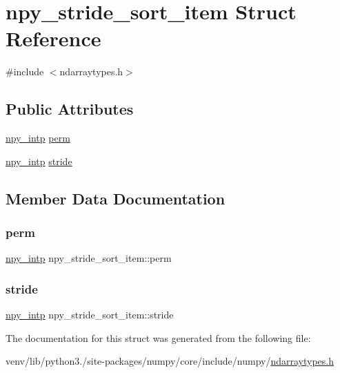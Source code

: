 \hypertarget{structnpy__stride__sort__item}{}\section{npy\+\_\+stride\+\_\+sort\+\_\+item Struct Reference}
\label{structnpy__stride__sort__item}


{\ttfamily \#include $<$ndarraytypes.\+h$>$}

\subsection*{Public Attributes}
\begin{DoxyCompactItemize}
\item 
\hyperlink{npy__common_8h_a2d6effc4d5ecb85675ebfcfaa102b483}{npy\+\_\+intp} \hyperlink{structnpy__stride__sort__item_a62c4593e1cdf5936819b24eab2326162}{perm}
\item 
\hyperlink{npy__common_8h_a2d6effc4d5ecb85675ebfcfaa102b483}{npy\+\_\+intp} \hyperlink{structnpy__stride__sort__item_a58b3a74b21f36004832323552caa0e00}{stride}
\end{DoxyCompactItemize}


\subsection{Member Data Documentation}
\mbox{\label{structnpy__stride__sort__item_a62c4593e1cdf5936819b24eab2326162}} 
\subsubsection{\texorpdfstring{perm}{perm}}
{\footnotesize\ttfamily \hyperlink{npy__common_8h_a2d6effc4d5ecb85675ebfcfaa102b483}{npy\+\_\+intp} npy\+\_\+stride\+\_\+sort\+\_\+item\+::perm}

\mbox{\label{structnpy__stride__sort__item_a58b3a74b21f36004832323552caa0e00}} 
\subsubsection{\texorpdfstring{stride}{stride}}
{\footnotesize\ttfamily \hyperlink{npy__common_8h_a2d6effc4d5ecb85675ebfcfaa102b483}{npy\+\_\+intp} npy\+\_\+stride\+\_\+sort\+\_\+item\+::stride}



The documentation for this struct was generated from the following file\+:\begin{DoxyCompactItemize}
\item 
venv/lib/python3./site-\/packages/numpy/core/include/numpy/\hyperlink{ndarraytypes_8h}{ndarraytypes.\+h}\end{DoxyCompactItemize}
